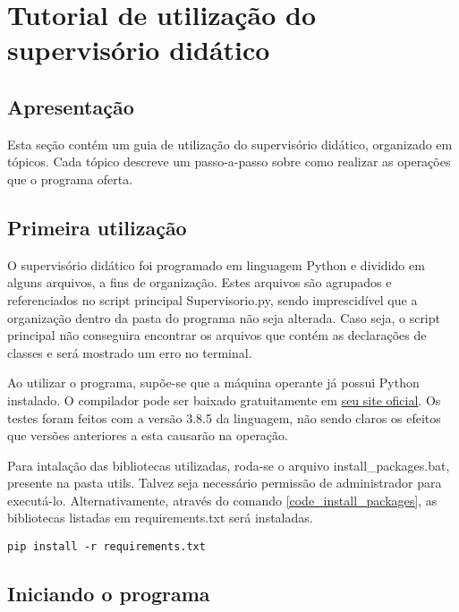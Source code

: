 \chapter{Tutorial de utilização do supervisório didático} \label{Chap:Apendice2}

\section{Apresentação}

Esta seção contém um guia de utilização do supervisório didático, organizado em tópicos. Cada tópico descreve um passo-a-passo sobre como realizar as operações que o programa oferta.

\section {Primeira utilização}

O supervisório didático foi programado em linguagem Python e dividido em alguns arquivos, a fins de organização. Estes arquivos são agrupados e referenciados no script principal Supervisorio.py, sendo imprescidível que a organização dentro da pasta do programa não seja alterada. Caso seja, o script principal não conseguira encontrar os arquivos que contém as declarações de classes e será mostrado um erro no terminal.

Ao utilizar o programa, supõe-se que a máquina operante já possui Python instalado. O compilador pode ser baixado gratuitamente em \href{https://www.python.org/}{seu site oficial}. Os testes foram feitos com a versão 3.8.5 da linguagem, não sendo claros os efeitos que versões anteriores a esta causarão na operação.

Para intalação das bibliotecas utilizadas, roda-se o arquivo install\_packages.bat, presente na pasta utils. Talvez seja necessário permissão de administrador para executá-lo. Alternativamente, através do comando \ref{code_install_packages}, as bibliotecas listadas em requirements.txt será instaladas.

\begin{code}
\begin{lstlisting}
pip install -r requirements.txt
\end{lstlisting}
\label{code_install_packages}
\end{code}

\section{Iniciando o programa}

